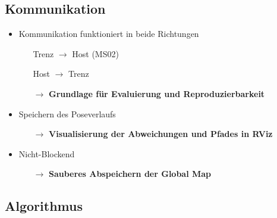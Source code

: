 \documentclass{beamer}
\begin{document}
\subsection{Kommunikation}
\begin{frame}{\subsecname}
\begin{itemize}
\item{Kommunikation funktioniert in beide Richtungen}
\begin{itemize}
\item[]{\color{dark} Trenz $\rightarrow$ Host (MS02)}
\item[]{\color{dark} Host  \hphantom{} $\rightarrow$ Trenz}
\item[$\rightarrow$]{\color{dark} \textbf{Grundlage für Evaluierung und Reproduzierbarkeit}}
\end{itemize}
\item{Speichern des Poseverlaufs}
\begin{itemize}
\item[$\rightarrow$]{\color{dark} \textbf{Visualisierung der Abweichungen und Pfades in RViz}}
\end{itemize}
\item{Nicht-Blockend}
\begin{itemize}
\item[$\rightarrow$]{\color{dark} \textbf{Sauberes Abspeichern der Global Map}}
\end{itemize}
\end{itemize}
\end{frame}

\subsection{Algorithmus}
\end{document}

